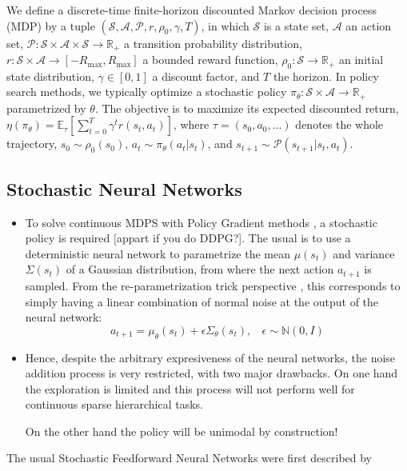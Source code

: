 \documentclass{article} %
\newcommand{\sset}{\mathcal{S}}
\newcommand{\aset}{\mathcal{A}}
\newcommand{\trans}{\mathcal{P}}
\begin{document}
    
    We define a discrete-time finite-horizon discounted Markov decision process (MDP) by a tuple $(\sset, \aset, \trans, r, \rho_0, \gamma, T)$, in which $\sset$ is a state set, $\aset$ an action set, $\trans: \sset \times \aset \times \sset \rightarrow \mathbb{R}_{+}$ a transition probability distribution, $r: \sset \times \aset \rightarrow [-R_{\max}, R_{\max}]$ a bounded reward function, $\rho_0: \sset \to \mathbb{R}_+$ an initial state distribution, $\gamma \in [0, 1]$ a discount factor, and $T$ the horizon. In policy search methods, we typically optimize a stochastic policy $\pi_{\theta}: \sset \times \aset \to \mathbb{R}_+$ parametrized by $\theta$. The objective is to maximize its expected discounted return, $ \eta(\pi_\theta) = \mathbb{E}_{\tau}[ \sum_{t=0}^T \gamma^t r(s_t, a_t) ]$, where $\tau = (s_0, a_0, \ldots)$ denotes the whole trajectory, $\displaystyle s_0 \sim \rho_0(s_0)$, $a_t \sim \pi_\theta(a_t|s_t)$, and $s_{t+1} \sim \trans(s_{t+1} | s_t, a_t)$.

\subsection{Stochastic Neural Networks}

\begin{itemize}
    \item To solve continuous MDPS with Policy Gradient methods \citep{peters2008reinforcement}, a stochastic policy is required [appart if you do DDPG?]. The usual is to use a deterministic neural network to parametrize the mean $\mu(s_t)$ and variance $\Sigma(s_t)$ of a Gaussian distribution, from where the next action $a_{t+1}$ is sampled. From the re-parametrization trick perspective \citep{look at SVG paper or DeepMind-modulate}, this corresponds to simply having a linear combination of normal noise at the output of the neural network:
    \begin{equation}
        a_{t+1} = \mu_{\theta}(s_t) +\epsilon \Sigma_\theta(s_t), ~~~~ \epsilon \sim \mathbb{N}(0,I)
    \end{equation}
    \item Hence, despite the arbitrary expresiveness of the neural networks, the noise addition process is very restricted, with two major drawbacks. On one hand the exploration is limited and this process will not perform well for continuous sparse hierarchical tasks. 
    
    On the other hand the policy will be unimodal by construction!
\end{itemize}
The usual Stochastic Feedforward Neural Networks were first described by \citet{tang2013sfnn}
\end{document}
